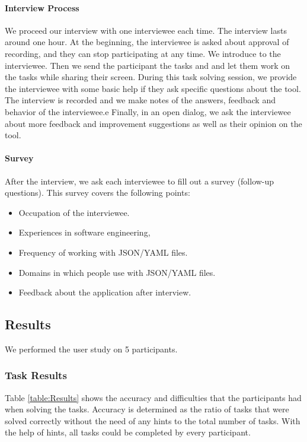 
\paragraph{Interview Process}
We proceed our interview with one interviewee each time.
The interview lasts around one hour.
At the beginning, the interviewee is asked about approval of recording, and they can stop participating at any time.
We introduce \toolname{} to the interviewee.
Then we send the participant the tasks and \cfgfile{} and let them work on the tasks while sharing their screen.
During this task solving session, we provide the interviewee with some basic help if they ask specific questions about the tool.
The interview is recorded and we make notes of the answers, feedback and behavior of the interviewee.e
Finally, in an open dialog, we ask the interviewee about more feedback and improvement suggestions as well as their opinion on the tool.

\paragraph{Survey}
After the interview, we ask each interviewee to fill out a survey (follow-up questions).
This survey covers the following points:
\begin{itemize}
    \item Occupation of the interviewee.
    \item Experiences in software engineering,
    \item Frequency of working with JSON/YAML files.
    \item Domains in which people use with JSON/YAML files.
    \item Feedback about the application after interview.
\end{itemize}

\subsection{Results}
We performed the user study on 5 participants.

\subsubsection{Task Results}
Table \ref{table:Results} shows the accuracy and difficulties that the participants had when solving the tasks.
Accuracy is determined as the ratio of tasks that were solved correctly without the need of any hints to the total number of tasks.
With the help of hints, all tasks could be completed by every participant.

